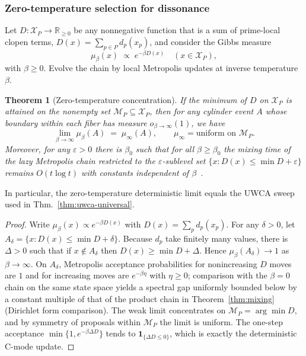 \documentclass[12pt]{article}
\newtheorem{theorem}{Theorem}[section]
\numberwithin{equation}{section}
\newcommand{\R}{\mathbb{R}}
\begin{document}
\subsubsection{Zero-temperature selection for dissonance}\label{subsec:B6-zeroT}
Let $D: \mathscr{X}_P\to \R_{\ge 0}$ be any nonnegative function that is a sum of prime-local clopen terms, $D(x)=\sum_{p\in P} d_p(x_p)$, and consider the Gibbs measure
\[
\mu_{\beta}(x) \;\propto\; e^{-\beta D(x)}\quad (x\in \mathscr{X}_P),
\]
with $\beta\ge 0$. Evolve the chain by local Metropolis updates at inverse temperature $\beta$.

\begin{theorem}[Zero-temperature concentration]\label{thm:zeroT}
If the minimum of $D$ on $\mathscr{X}_P$ is attained on the nonempty set $\mathscr{M}_P\subseteq \mathscr{X}_P$, then for any cylinder event $A$ whose boundary within each fiber has measure $o_{\beta\to\infty}(1)$, we have
\[
\lim_{\beta\to\infty} \mu_{\beta}(A) \;=\; \mu_{\infty}(A),\qquad \mu_{\infty}=\text{uniform on }\mathscr{M}_P.
\]
Moreover, for any $\varepsilon>0$ there is $\beta_0$ such that for all $\beta\ge \beta_0$ the mixing time of the lazy Metropolis chain restricted to the $\varepsilon$-sublevel set $\{x: D(x)\le \min D + \varepsilon\}$ remains $O(t\log t)$ with constants independent of $\beta$~\cite{SpivackUGPFormalization,ugp-lean}.
\end{theorem}

\noindent In particular, the zero-temperature deterministic limit equals the UWCA sweep used in Thm.~\ref{thm:uwca-universal}.

\begin{proof}
Write $\mu_\beta(x)\propto e^{-\beta D(x)}$ with $D(x)=\sum_p d_p(x_p)$. For any $\delta>0$, let $A_\delta=\{x: D(x)\le \min D+\delta\}$. Because $d_p$ take finitely many values, there is $\Delta>0$ such that if $x\notin A_\delta$ then $D(x)\ge \min D+\Delta$. Hence $\mu_\beta(A_\delta)\to 1$ as $\beta\to\infty$. On $A_\delta$, Metropolis acceptance probabilities for nonincreasing $D$ moves are $1$ and for increasing moves are $e^{-\beta\eta}$ with $\eta\ge 0$; comparison with the $\beta=0$ chain on the same state space yields a spectral gap uniformly bounded below by a constant multiple of that of the product chain in Theorem~\ref{thm:mixing} (Dirichlet form comparison). The weak limit concentrates on $\mathscr{M}_P=\arg\min D$, and by symmetry of proposals within $\mathscr{M}_P$ the limit is uniform. The one-step acceptance $\min\{1,e^{-\beta\Delta D}\}$ tends to $\mathbf{1}_{\{\Delta D\le 0\}}$, which is exactly the deterministic C-mode update. 
\end{proof}
\end{document}
